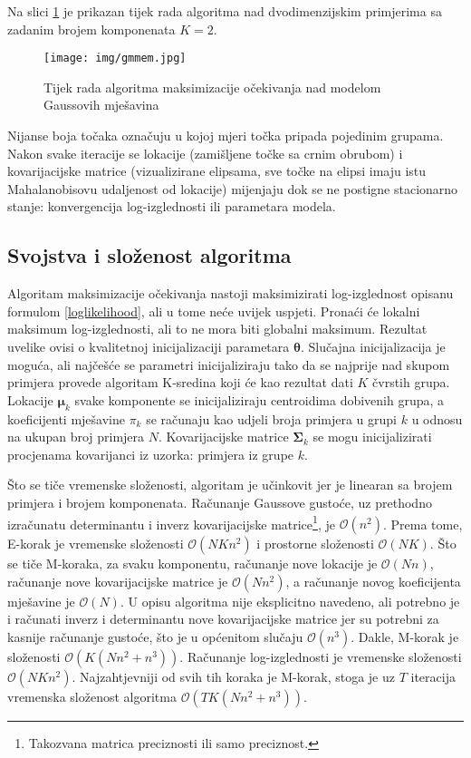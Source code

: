 \documentclass[times, utf8, zavrsni]{fer}
\begin{document}
Na slici \ref{fig:gmmem} je prikazan tijek rada algoritma nad dvodimenzijskim primjerima sa zadanim brojem komponenata $K = 2$. 
\begin{figure}[H]
    \centering
    \texttt{[image: img/gmmem.jpg]}
    \caption{Tijek rada algoritma maksimizacije očekivanja nad modelom Gaussovih mješavina}
    \label{fig:gmmem}
\end{figure}
Nijanse boja točaka označuju u kojoj mjeri točka pripada pojedinim grupama. Nakon svake iteracije se lokacije (zamišljene točke sa crnim obrubom) i kovarijacijske matrice (vizualizirane elipsama, sve točke na elipsi imaju istu Mahalanobisovu udaljenost od lokacije) mijenjaju dok se ne postigne stacionarno stanje: konvergencija log-izglednosti ili parametara modela. 

\subsection{Svojstva i složenost algoritma}
Algoritam maksimizacije očekivanja nastoji maksimizirati log-izglednost opisanu formulom \ref{loglikelihood}, ali u tome neće uvijek uspjeti. Pronaći će lokalni maksimum log-izglednosti, ali to ne mora biti globalni maksimum. Rezultat uvelike ovisi o kvalitetnoj inicijalizaciji parametara $\boldsymbol{\theta}$. Slučajna inicijalizacija je moguća, ali najčešće se parametri inicijaliziraju tako da se najprije nad skupom primjera provede algoritam K-sredina koji će kao rezultat dati $K$ čvrstih grupa. Lokacije $\boldsymbol{\mu}_k$ svake komponente se inicijaliziraju centroidima dobivenih grupa, a koeficijenti mješavine $\pi_k$ se računaju kao udjeli broja primjera u grupi $k$ u odnosu na ukupan broj primjera $N$. Kovarijacijske matrice $\boldsymbol{\Sigma}_k$ se mogu inicijalizirati procjenama kovarijanci iz uzorka: primjera iz grupe $k$.

Što se tiče vremenske složenosti, algoritam je učinkovit jer je linearan sa brojem primjera i brojem komponenata. Računanje Gaussove gustoće, uz prethodno izračunatu determinantu i inverz kovarijacijske matrice\footnote{Takozvana matrica preciznosti ili samo preciznost.}, je $\mathcal{O} \left(n^2\right)$. Prema tome, E-korak je vremenske složenosti $\mathcal{O} \left(N K n^2\right)$ i prostorne složenosti $\mathcal{O} \left(N K\right)$. Što se tiče M-koraka, za svaku komponentu, računanje nove lokacije je $\mathcal{O} \left(N n\right)$, računanje nove kovarijacijske matrice je $\mathcal{O} \left(N n^2\right)$, a računanje novog koeficijenta mješavine je $\mathcal{O} \left(N\right)$. U opisu algoritma nije eksplicitno navedeno, ali potrebno je i računati inverz i determinantu nove kovarijacijske matrice jer su potrebni za kasnije računanje gustoće, što je u općenitom slučaju $\mathcal{O} \left(n^3\right)$. Dakle, M-korak je složenosti $\mathcal{O} \left(K \left(N n^2 + n^3\right)\right)$. Računanje log-izglednosti je vremenske složenosti $\mathcal{O} \left(N K n^2\right)$. Najzahtjevniji od svih tih koraka je M-korak, stoga je uz $T$ iteracija vremenska složenost algoritma $\mathcal{O} \left(T K \left(N n^2 + n^3\right)\right)$.
\end{document}

